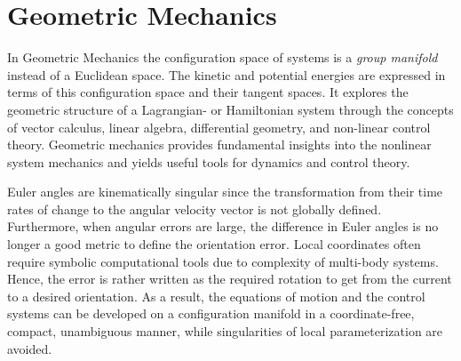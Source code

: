 \section{Geometric Mechanics}\label{sec:mod.geometric}
In Geometric Mechanics the configuration space of systems is a \textit{group manifold} instead of a Euclidean space. The kinetic and potential energies are expressed in terms of this configuration space and their tangent spaces. It explores the geometric structure of a Lagrangian- or Hamiltonian system through the concepts of vector calculus, linear algebra, differential geometry, and non-linear control theory. Geometric mechanics provides fundamental insights into the nonlinear system mechanics and yields useful tools for dynamics and control theory.

Euler angles are kinematically singular since the transformation from their time rates of change to the angular velocity vector is not globally defined. Furthermore, when angular errors are large, the difference in Euler angles is no longer a good metric to define the orientation error. Local coordinates often require symbolic computational tools due to complexity of multi-body systems. Hence, the error is rather written as the required rotation to get from the current to a desired orientation. As a result, the equations of motion and the control systems can be developed on a configuration manifold in a coordinate-free, compact, unambiguous manner, while singularities of local parameterization are avoided.

